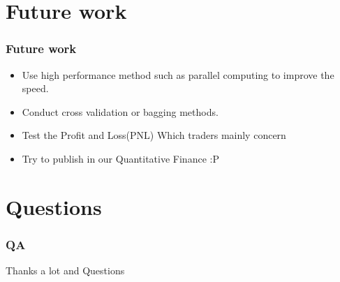 \documentclass[xcolor={x11names,svgnames,dvipsnames}]{beamer}
\begin{document}
\section{Future work}
\begin{frame}
\frametitle{Future work}
    \begin{itemize}
        \item  Use high performance method such as parallel computing to improve the speed.
        \item  Conduct cross validation or bagging methods.
        \item  Test the Profit and Loss(PNL) Which traders mainly concern
        \item  Try to publish in our Quantitative Finance :P
      \end{itemize}
\end{frame}

\section{Questions}

\begin{frame}
\frametitle{QA}
\begin{center}
\huge{Thanks a lot and Questions}
\end{center}
\end{frame}
\end{document}
